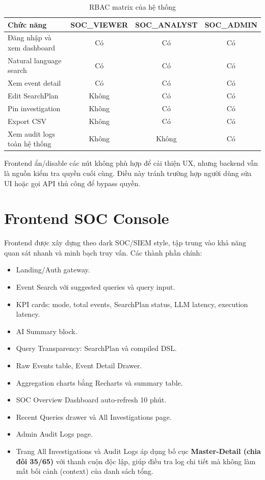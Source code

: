 \documentclass[12pt,a4paper]{report}
\begin{document}
\begin{table}[H]
\centering
\caption{RBAC matrix của hệ thống}
\begin{tabular}{lccc}
\toprule
\textbf{Chức năng} & \textbf{SOC\_VIEWER} & \textbf{SOC\_ANALYST} & \textbf{SOC\_ADMIN} \\
\midrule
Đăng nhập và xem dashboard & Có & Có & Có \\
Natural language search & Có & Có & Có \\
Xem event detail & Có & Có & Có \\
Edit SearchPlan & Không & Có & Có \\
Pin investigation & Không & Có & Có \\
Export CSV & Không & Có & Có \\
Xem audit logs toàn hệ thống & Không & Không & Có \\
\bottomrule
\end{tabular}
\end{table}

Frontend ẩn/disable các nút không phù hợp để cải thiện UX, nhưng backend vẫn là nguồn kiểm tra quyền cuối cùng. Điều này tránh trường hợp người dùng sửa UI hoặc gọi API thủ công để bypass quyền.

\section{Frontend SOC Console}

Frontend được xây dựng theo dark SOC/SIEM style, tập trung vào khả năng quan sát nhanh và minh bạch truy vấn. Các thành phần chính:

\begin{itemize}
    \item Landing/Auth gateway.
    \item Event Search với suggested queries và query input.
    \item KPI cards: mode, total events, SearchPlan status, LLM latency, execution latency.
    \item AI Summary block.
    \item Query Transparency: SearchPlan và compiled DSL.
    \item Raw Events table, Event Detail Drawer.
    \item Aggregation charts bằng Recharts và summary table.
    \item SOC Overview Dashboard auto-refresh 10 phút.
    \item Recent Queries drawer và All Investigations page.
    \item Admin Audit Logs page.
    \item Trang All Investigations và Audit Logs áp dụng bố cục \textbf{Master-Detail (chia đôi 35/65)} với thanh cuộn độc lập, giúp điều tra log chi tiết mà không làm mất bối cảnh (context) của danh sách tổng.
\end{itemize}
\end{document}
